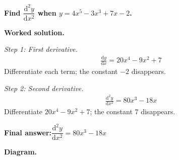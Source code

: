 \documentclass[11pt]{article}
\newcommand{\question}[1]{\par\medskip\noindent\textbf{#1}\par}
\begin{document}
\question{Find \( \dfrac{\mathrm{d}^2y}{\mathrm{d}x^2} \) when \( y = 4x^5 - 3x^3 + 7x - 2 \).}

\textbf{Worked solution.}

\textit{Step 1: First derivative.}
\[\begin{gathered}
\frac{\mathrm{d}y}{\mathrm{d}x} = 20x^4 - 9x^2 + 7
\end{gathered}\]
Differentiate each term; the constant \(-2\) disappears.

\textit{Step 2: Second derivative.}
\[\begin{gathered}
\frac{\mathrm{d}^2y}{\mathrm{d}x^2} = 80x^3 - 18x
\end{gathered}\]
Differentiate \(20x^4 - 9x^2 + 7\); the constant \(7\) disappears.

\begin{answerbox}
\textbf{Final answer:}\quad \(\displaystyle  \dfrac{\mathrm{d}^2y}{\mathrm{d}x^2} = 80x^3 - 18x \)
\end{answerbox}
\textbf{Diagram.}
\end{document}
